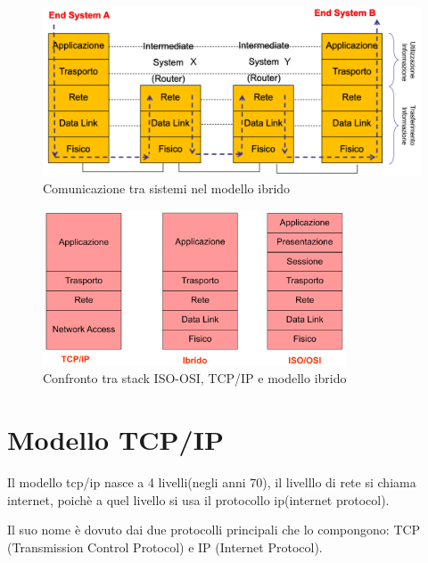 \begin{figure}[h!]
    \centering
    \includegraphics[width=1\textwidth]{images/comunicazione_ibrido.png}
    \caption{Comunicazione tra sistemi nel modello ibrido}
    \label{fig:comunicazione_sistemi_ibrido}
\end{figure}

\begin{figure}[h!]
    \centering
    \includegraphics[width=0.8\textwidth]{images/confronto_stack.png}
    \caption{Confronto tra stack ISO-OSI, TCP/IP e modello ibrido}
    \label{fig:confronto_stack}
\end{figure}

    \newpage
\section{Modello TCP/IP}
Il modello tcp/ip nasce a 4 livelli(negli anni 70), il livelllo di rete si chiama internet, poichè a quel livello si usa il protocollo ip(internet protocol).

Il suo nome è dovuto dai due protocolli principali che lo compongono: TCP (Transmission Control Protocol) e IP (Internet Protocol).

